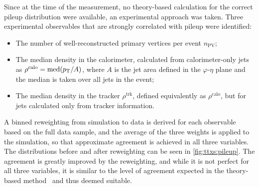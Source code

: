 Since at the time of the measurement, no theory-based calculation for the correct pileup distribution were available, an experimental approach was taken. Three experimental observables that are strongly correlated with pileup were identified: 

\begin{itemize}
    \item The number of well-reconstructed primary vertices per event $n_{\mathrm{PV}}$;
    \item The median \pt density in the calorimeter, calculated from calorimeter-only jets as $\rho^{\mathrm{calo}} = \mathrm{med} (p_{\mathrm{T}} / A)$, where $A$ is the jet area defined in the $\varphi$-$\eta$ plane and the median is taken over all jets in the event;
    \item The median \pt density in the tracker $\rho^{\mathrm{trk}}$, defined equivalently as $\rho^{\mathrm{calo}}$, but for jets calculated only from tracker information.
\end{itemize}

A binned reweighting from simulation to data is derived for each observable based on the full data sample, and the average of the three weights is applied to the simulation, so that approximate agreement is achieved in all three variables. The distributions before and after reweighting can be seen in \cref{fig:ttxs:pileup}. The agreement is greatly improved by the reweighting, and while it is not perfect for all three variables, it is similar to the level of agreement expected in the theory-based method~\cite{CMS:LUM-17-003} and thus deemed suitable.


